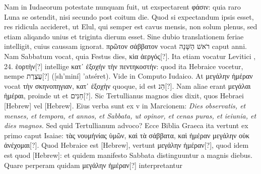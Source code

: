 Nam in Iudaeorum potestate
nunquam fuit, ut exspectarent \textgreek{φάσιν}:
 quia raro Luna se ostendit,
nisi secundo post coitum die.
Quod si expectandum ipsis esset,
res ridicula accideret, ut Elul, qui semper est cavus mensis, non solum
plenus, sed etiam aliqando unius et triginta dierum esset.
Sine dubio translationem feriae intelligit, cuius caussam ignorat.
\textgreek{πρῶτον σάββατον} vocat
 \texthebrew{רֹאשׁ הַשָּׁנָה‎}
 caput anni.
Nam Sabbatum vocat, quia Festus
dies, \textgreek{κὶα ἀεργός}[?].
Ita etiam vocatur Levitici , 24.
\textgreek{ἑορτὴν}[?]
 intellige
\textgreek{κατ᾽ ἐξοχήν τὴν πεντηκοστήν}:
 quod ita Hebraice vocetur, nempe \texthebrew{עֲצֶרֶת}[?] ([sh'miní] 'atséret).
Vide in Computo Iudaico.
At \textgreek{μεγάλην ἡμέραν}
 vocat \textgreek{τὴν σκηνοπηγιαν, κατ᾽ ἐξοχὴν}
 quoque, id est \texthebrew{הַנ}[?].
Nam aliae erant \textgreek{μεγάλαι ἡμέραι},
proinde ut et \texthebrew{חַנִּים}[?].
Sic Tertullianus magnos dies dixit, quos
Hebraei \texthebrew{[Hebrew]} vel \texthebrew{[Hebrew]}.
Eius verba sunt ex v in Marcionem:
\textit{Dies observatis, et menses, et tempora, et annos, et Sabbata, ut opinor,
et cenas puras, et ieiunia, et dies magnos.}
Sed quid Tertullianum
advoco?
Ecce Biblia Graeca ita vertunt ex primo caput Isaiae:
\textgreek{τὰς νουμἠνίας ὑμῶν, καὶ τὰ σάββατα,
 καὶ ἡμέραν μεγάλην οὐκ ἀνέχομαι}[?].
Quod Hebraice est \texthebrew{[Hebrew]},
 vertunt \textgreek{μεγάλην ἡμέραν[?]}, quod idem
est quod \texthebrew{[Hebrew]}: et quidem manifesto Sabbata distinguuntur a
magnis diebus. 
Quare perperam quidam \textgreek{μεγάλην ἡμέραν[?]} interpretantur
